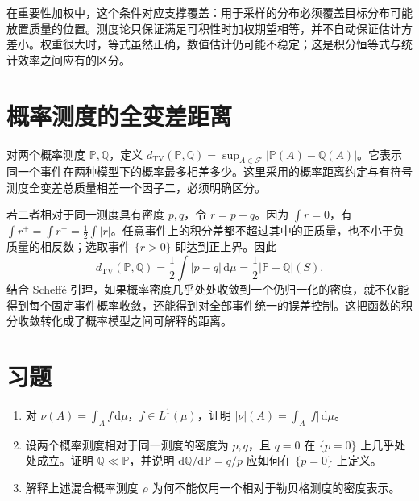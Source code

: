 在重要性加权中，这个条件对应支撑覆盖：用于采样的分布必须覆盖目标分布可能放置质量的位置。测度论只保证满足可积性时加权期望相等，并不自动保证估计方差小。权重很大时，等式虽然正确，数值估计仍可能不稳定；这是积分恒等式与统计效率之间应有的区分。

\section{概率测度的全变差距离}
对两个概率测度 $\mathbb P,\mathbb Q$，定义
$d_{\mathrm{TV}}(\mathbb P,\mathbb Q)=\sup_{A\in\mathcal F}|\mathbb P(A)-\mathbb Q(A)|$。它表示同一个事件在两种模型下的概率最多相差多少。这里采用的概率距离约定与有符号测度全变差总质量相差一个因子二，必须明确区分。

若二者相对于同一测度具有密度 $p,q$，令 $r=p-q$。因为 $\int r=0$，有 $\int r^+=\int r^-=\tfrac12\int|r|$。任意事件上的积分差都不超过其中的正质量，也不小于负质量的相反数；选取事件 $\{r>0\}$ 即达到正上界。因此
\[
 d_{\mathrm{TV}}(\mathbb P,\mathbb Q)
 =\frac12\int|p-q|\,\mathrm d\mu
 =\frac12|\mathbb P-\mathbb Q|(S).
\]
结合 Scheffé 引理，如果概率密度几乎处处收敛到一个仍归一化的密度，就不仅能得到每个固定事件概率收敛，还能得到对全部事件统一的误差控制。这把函数的积分收敛转化成了概率模型之间可解释的距离。

\section{习题}
\begin{enumerate}
 \item 对 $\nu(A)=\int_Af\,\mathrm d\mu$，$f\in L^1(\mu)$，证明 $|\nu|(A)=\int_A|f|\,\mathrm d\mu$。
 \item 设两个概率测度相对于同一测度的密度为 $p,q$，且 $q=0$ 在 $\{p=0\}$ 上几乎处处成立。证明 $\mathbb Q\ll\mathbb P$，并说明 $\mathrm d\mathbb Q/\mathrm d\mathbb P=q/p$ 应如何在 $\{p=0\}$ 上定义。
 \item 解释上述混合概率测度 $\rho$ 为何不能仅用一个相对于勒贝格测度的密度表示。
\end{enumerate}

